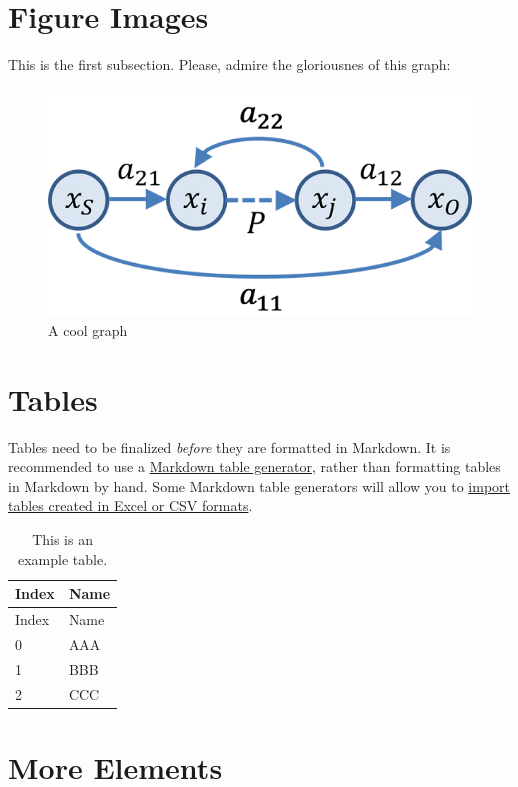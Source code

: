 \documentclass[
  11pt,
,
onecolumn,
openany
]{book}
\begin{document}
\hypertarget{figure-images}{%
\section{Figure Images}\label{figure-images}}

This is the first subsection. Please, admire the gloriousnes of this graph:

\begin{figure}
\hypertarget{fig:graph}{%
\centering
\includegraphics{graph.png}
\caption{A cool graph}\label{fig:graph}
}
\end{figure}

\hypertarget{tables}{%
\section{Tables}\label{tables}}

Tables need to be finalized \emph{before} they are formatted in Markdown. It
is recommended to use a
\href{https://www.tablesgenerator.com/markdown_tables}{Markdown table
generator}, rather than formatting tables in Markdown by hand. Some Markdown
table generators will allow you to
\href{https://jakebathman.github.io/Markdown-Table-Generator/}{import tables
created in Excel or CSV formats}.

\begin{longtable}[]{@{}ll@{}}
\caption{This is an example table.}\tabularnewline
\toprule
Index & Name \\
\midrule
\endfirsthead
\toprule
Index & Name \\
\midrule
\endhead
0 & AAA \\
1 & BBB \\
2 & CCC \\
\bottomrule
\end{longtable}

\hypertarget{more-elements}{%
\section{More Elements}\label{more-elements}}
\end{document}
